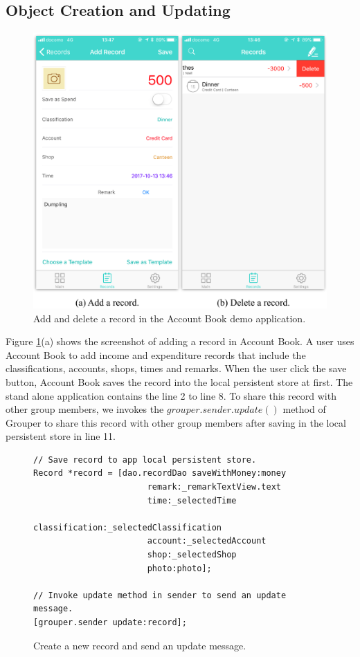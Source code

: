 \documentclass[a4paper,11pt]{report}
\begin{document}
\subsection{Object Creation and Updating}

\begin{figure}[t]
	\centering
	\includegraphics[scale=0.8]{account_book}
	\caption{Add and delete a record in the Account Book demo application.}
	\label{fig:add_delete_record}
\end{figure}

Figure \ref{fig:add_delete_record}(a) shows the screenshot of adding a record in Account Book. 
A user uses Account Book to add income and expenditure records that include the classifications, accounts, shops, times and remarks. 
When the user click the save button, Account Book saves the record into the local persistent store at first.
The stand alone application contains the line 2 to line 8.
To share this record with other group members, we invokes the $grouper.sender.update()$ method of Grouper to share this record with other group members after saving in the local persistent store in line 11.

\begin{figure}
\begin{lstlisting}[frame=none language=Objective-C] 
// Save record to app local persistent store.
Record *record = [dao.recordDao saveWithMoney:money
                       remark:_remarkTextView.text
                       time:_selectedTime
                       classification:_selectedClassification
                       account:_selectedAccount
                       shop:_selectedShop
                       photo:photo];

// Invoke update method in sender to send an update message.
[grouper.sender update:record];
\end{lstlisting}
\caption{Create a new record and send an update message.}
\label{fig:create_record}
\end{figure}
\end{document}
